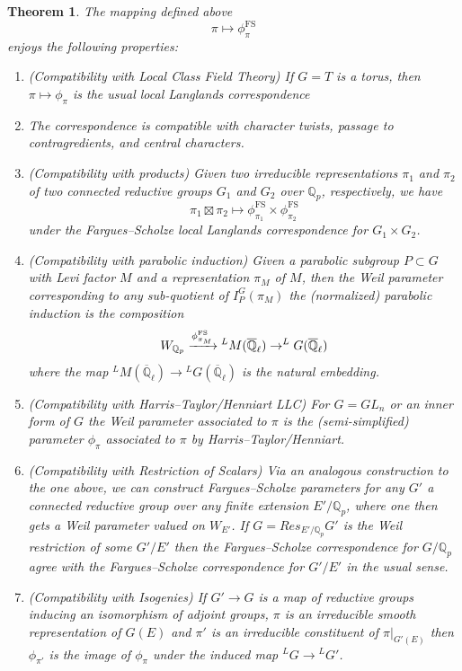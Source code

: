 \documentclass[reqno,11pt]{amsart}
\newtheorem{theorem}{Theorem}[section]
\theoremstyle{remark}
\newcommand{\LL}{{}^L}
\begin{document}
\begin{theorem}{\cite[Theorem~I.9.6]{FS}}{\label{FSproperties}}
The mapping defined above 
\[ \pi \mapsto \phi^{\mathrm{FS}}_{\pi} \]
enjoys the following properties:
\begin{enumerate}
    \item (Compatibility with Local Class Field Theory) If $G = T$ is a torus, then $\pi \mapsto \phi_{\pi}$ is the usual local Langlands correspondence 
    \item The correspondence is compatible with character twists, passage to contragredients, and central characters.
    \item (Compatibility with products) Given two irreducible representations $\pi_{1}$ and $\pi_{2}$ of two connected reductive groups $G_{1}$ and $G_{2}$ over $\mathbb{Q}_{p}$, respectively, we have
    \[ \pi_{1} \boxtimes \pi_{2} \mapsto \phi^{\mathrm{FS}}_{\pi_{1}} \times \phi^{\mathrm{FS}}_{\pi_{2}}\]
    under the Fargues--Scholze local Langlands correspondence for $G_{1} \times G_{2}$. 
    \item (Compatibility with parabolic induction) Given a parabolic subgroup $P \subset G$ with Levi factor $M$ and a representation $\pi_{M}$ of $M$, then the Weil parameter corresponding to any sub-quotient of $I_{P}^{G}(\pi_{M})$ the (normalized) parabolic induction is the composition
    \[ W_{\mathbb{Q}_{p}}\xrightarrow{\phi^{\mathrm{FS}}_{\pi_{M}}} \\  ^{L}M(\overline{\mathbb{Q}}_{\ell}) \rightarrow ^{L}G(\overline{\mathbb{Q}}_{\ell}) \]
    where the map $\phantom{}^{L}M(\overline{\mathbb{Q}}_{\ell}) \rightarrow \phantom{}^{L}G(\overline{\mathbb{Q}}_{\ell})$ is the natural embedding. 
    \item (Compatibility with Harris--Taylor/Henniart LLC)
    For $G = GL_{n}$ or an inner form of $G$ the Weil parameter associated to $\pi$ is the (semi-simplified) parameter $\phi_{\pi}$ associated to $\pi$ by Harris--Taylor/Henniart.
    \item (Compatibility with Restriction of Scalars) Via an analogous construction to the one above, we can construct Fargues--Scholze parameters for any $G'$ a connected reductive group over any finite extension $E'/\mathbb{Q}_{p}$, where one then gets a Weil parameter valued on $W_{E'}$. If $G = Res_{E'/\mathbb{Q}_{p}}G'$ is the Weil restriction of some $G'/E'$ then the Fargues--Scholze correspondence for $G/\mathbb{Q}_{p}$ agree with the Fargues--Scholze correspondence for $G'/E'$ in the usual sense.
    \item (Compatibility with Isogenies) If $G' \rightarrow G$ is a map of reductive groups inducing an isomorphism of adjoint groups, $\pi$ is an irreducible smooth representation of $G(E)$ and $\pi'$ is an irreducible constituent of $\pi|_{G'(E)}$ then $\phi_{\pi'}$ is the image of $\phi_{\pi}$ under the induced map $\LL G \rightarrow \LL G'$. 
\end{enumerate}
\end{theorem}
\end{document}
